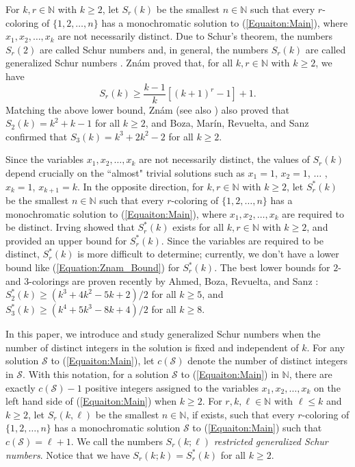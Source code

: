 \documentclass[11pt]{article}
\theoremstyle{definition}
\begin{document}
For $k,r\in\mathbb{N}$ with $k\geq2$, let $S_r(k)$ be the smallest $n\in\mathbb{N}$ such that every $r$-coloring of $\{1,2,\ldots,n\}$ has a monochromatic solution to (\ref{Equaiton:Main}), where $x_1,x_2,\ldots,x_k$ are not necessarily distinct. Due to Schur's theorem, the numbers $S_r(2)$ are called Schur numbers and, in general, the numbers $S_r(k)$ are called generalized Schur numbers \cite[p.~235]{LR2014}. Zn\'{a}m \cite{Znam1966} proved that, for all $k,r\in\mathbb{N}$ with $k\geq2$, we have
\begin{equation}\label{Equation:Znam_Bound}
S_r(k)\geq\frac{k-1}{k}[(k+1)^r-1]+1.
\end{equation}
Matching the above lower bound, Zn\'{a}m \cite{Znam1967} (see also \cite{BB1982}) also proved that $S_2(k)=k^2+k-1$ for all $k\geq2$, and Boza, Mar\'{i}n, Revuelta, and Sanz \cite{BMRS2019} confirmed that $S_3(k)=k^3+2k^2-2$ for all $k\geq2$.

Since the variables $x_1,x_2,\ldots,x_k$ are not necessarily distinct, the values of $S_r(k)$ depend crucially on the ``almost" trivial solutions such as $x_1=1$, $x_2=1$, $\ldots$ , $x_k=1$, $x_{k+1}=k$. In the opposite direction, for $k,r\in\mathbb{N}$ with $k\geq2$, let $S^*_r(k)$ be the smallest $n\in\mathbb{N}$ such that every $r$-coloring of $\{1,2,\ldots,n\}$ has a monochromatic solution to (\ref{Equaiton:Main}), where $x_1,x_2,\ldots,x_k$ are required to be distinct. Irving \cite{Irving1973} showed that $S_r^*(k)$ exists for all $k,r\in\mathbb{N}$ with $k\geq2$, and provided an upper bound for $S_r^*(k)$. Since the variables are required to be distinct, $S_r^*(k)$ is more difficult to determine; currently, we don't have a lower bound like (\ref{Equation:Znam_Bound}) for $S_r^*(k)$. The best lower bounds for $2$- and $3$-colorings are proven recently by Ahmed, Boza, Revuelta, and Sanz \cite{ABRS2023}: $S_2^*(k)\geq(k^3+4k^2-5k+2)/2$ for all $k\geq5$, and $S_3^*(k)\geq(k^4+5k^3-8k+4)/2$ for all $k\geq8$.

In this paper, we introduce and study generalized Schur numbers when the number of distinct integers in the solution is fixed and independent of $k$. For any solution $\mathcal{S}$ to (\ref{Equaiton:Main}), let $c(\mathcal{S})$ denote the number of distinct integers in $\mathcal{S}$. With this notation, for a solution $\mathcal{S}$ to (\ref{Equaiton:Main}) in $\mathbb{N}$, there are exactly $c(\mathcal{S})-1$ positive integers assigned to the variables $x_1,x_2,\ldots,x_k$ on the left hand side of (\ref{Equaiton:Main}) when $k\geq2$. For $r,k,\ell\in\mathbb{N}$ with $\ell\leq k$ and $k\geq2$, let $S_r(k,\ell)$ be the smallest $n\in\mathbb{N}$, if exists, such that every $r$-coloring of $\{1,2,\ldots,n\}$ has a monochromatic solution $\mathcal{S}$ to (\ref{Equaiton:Main}) such that $c(\mathcal{S})=\ell+1$. We call the numbers $S_r(k;\ell)$ \textit{restricted generalized Schur numbers}. Notice that we have $S_r(k;k)=S_r^*(k)$ for all $k\geq2$.
\end{document}
